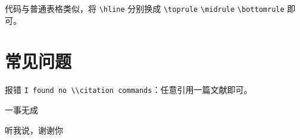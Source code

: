 \documentclass{NauThesis}
\begin{document}
代码与普通表格类似，将 \verb|\hline| 分别换成 \verb|\toprule| \verb|\midrule| \verb|\bottomrule| 即可。

\chapter{常见问题}
报错 \verb|I found no \\citation commands|：任意引用一篇文献即可。













\begin{ResearchAchievements}
    一事无成
\end{ResearchAchievements}

\begin{ThanksPage}
    听我说，谢谢你
\end{ThanksPage}
\end{document}
